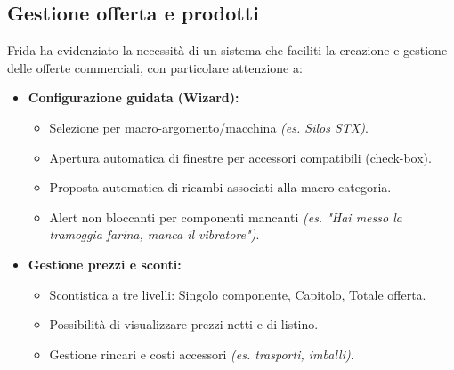 \documentclass[12pt, a4paper]{article} %
\begin{document}
\subsection{Gestione offerta e prodotti}
Frida ha evidenziato la necessità di un sistema che faciliti la creazione e
gestione delle offerte commerciali, con particolare attenzione a:
\begin{itemize}
      \item \textbf{Configurazione guidata (Wizard):}
            \begin{itemize}
                  \item Selezione per macro-argomento/macchina \textit{(es. Silos STX)}.
                  \item Apertura automatica di finestre per accessori compatibili (check-box).
                  \item Proposta automatica di ricambi associati alla macro-categoria.
                  \item Alert non bloccanti per componenti mancanti \textit{(es. "Hai messo la
                              tramoggia farina, manca il vibratore")}.
            \end{itemize}
      \item \textbf{Gestione prezzi e sconti:}
            \begin{itemize}
                  \item Scontistica a tre livelli: Singolo componente, Capitolo, Totale offerta.
                  \item Possibilità di visualizzare prezzi netti e di listino.
                  \item Gestione rincari e costi accessori \textit{(es. trasporti, imballi)}.
            \end{itemize}


\end{itemize}
\end{document}
